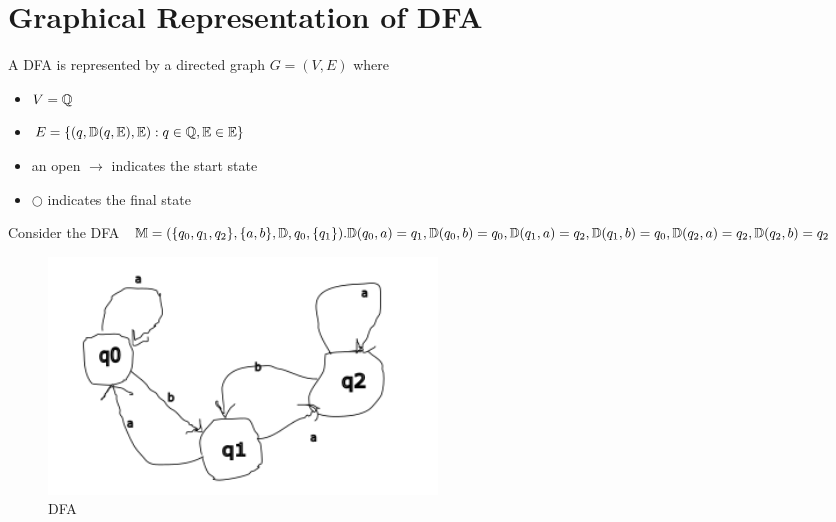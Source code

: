 \section{Graphical Representation of DFA}

\begin{definition}{}
    A DFA is represented by a directed graph $G = (V, E)$ where \begin{itemize}
        \item $V = \mathbb{Q}$
        \item $E = \{ (q, \mathbb{D}(q, \mathbb{E}), \mathbb{E}) : q \in \mathbb{Q}, \mathbb{E} \in \mathbb{E} \}$
        \item an open $\rightarrow$ indicates the start state
        \item $\bigcirc$ indicates the final state 
    \end{itemize}
\end{definition}

\begin{example}
    Consider the DFA $ \mathbb{M} = ( \{q_0, q_1, q_2\} , \{a, b\} , \mathbb{D}, q_0, \{q_1\} ). \\  \mathbb{D}(q_0, a) = q_1, \mathbb{D}(q_0, b) = q_0, \mathbb{D}(q_1, a) = q_2, \mathbb{D}(q_1, b) = q_0, \mathbb{D}(q_2, a) = q_2, \mathbb{D}(q_2, b) = q_2 $   
\end{example}

\begin{figure}[!h]
    \centering
    \includegraphics[width=0.5\textwidth]{figures/graphical_1.png}
    \caption{DFA}
\end{figure}

